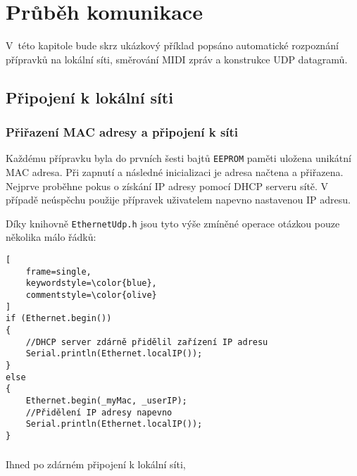 \chapter{Průběh komunikace}
V~této kapitole bude skrz ukázkový příklad popsáno automatické rozpoznání přípravků na lokální síti, směrování \acs{MIDI} zpráv a konstrukce UDP datagramů.

\section{Připojení k lokální síti}
\subsection{Přiřazení MAC adresy a připojení k síti}
Každému přípravku byla do prvních šesti bajtů \texttt{EEPROM} paměti uložena unikátní MAC adresa. Při zapnutí a následné inicializaci je adresa načtena a přiřazena. Nejprve proběhne pokus o získání IP adresy pomocí DHCP serveru sítě. V případě neúspěchu použije přípravek uživatelem napevno nastavenou IP adresu. 

Díky knihovně \texttt{EthernetUdp.h} jsou tyto výše zmíněné operace otázkou pouze několika málo řádků:
\begin{lstlisting}[
    frame=single,
    keywordstyle=\color{blue},
    commentstyle=\color{olive}
]
if (Ethernet.begin())
{
    //DHCP server zdárně přidělil zařízení IP adresu
    Serial.println(Ethernet.localIP());
}
else
{
    Ethernet.begin(_myMac, _userIP);
    //Přidělení IP adresy napevno
    Serial.println(Ethernet.localIP());
}
\end{lstlisting}

\subsection{}
Ihned po zdárném připojení k lokální síti,


